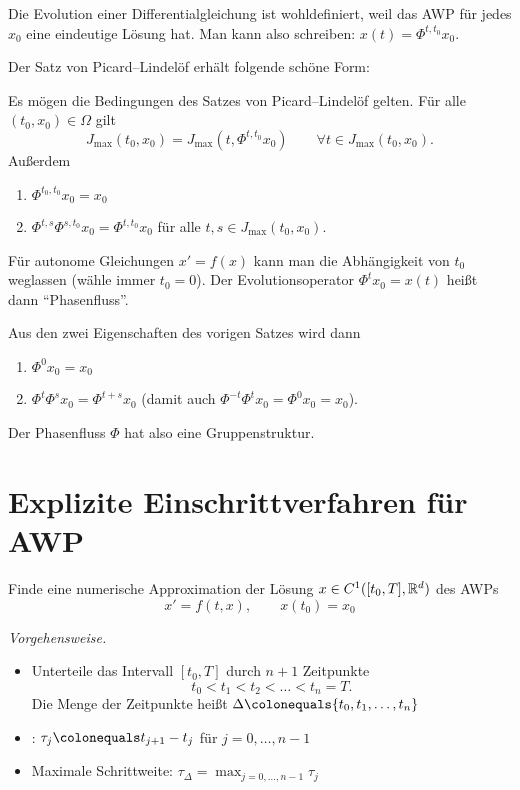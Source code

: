 Die Evolution einer Differentialgleichung ist wohldefiniert, weil das AWP für jedes $x_0$ eine eindeutige Lösung hat. Man kann also schreiben: $x(t) = \Phi^{t,t_0} x_0$.

Der Satz von Picard--Lindelöf erhält folgende schöne Form: \cite[Lemma~2.9]{deuflhard_bornemann:2008}

\begin{satz}
	Es mögen die Bedingungen des Satzes von Picard--Lindelöf gelten.
	Für alle $(t_0,x_0 ) \in \Omega$ gilt
	\begin{equation*}
		J_\text{max} (t_0,x_0)= J_\text{max} (t,\Phi^{t,t_0} x_0)
		\qquad
		\forall t \in J_\text{max} (t_0,x_0).
	\end{equation*}
	Außerdem
	\begin{enumerate}
		\item $\Phi^{t_0,t_0} x_0=x_0$
		\item $\Phi^{t,s} \Phi^{s,t_0} x_0 = \Phi^{t,t_0} x_0$ für alle $t,s \in J_\text{max}(t_0, x_0)$.
	\end{enumerate}
\end{satz}

Für autonome Gleichungen $x'=f(x)$ kann man die Abhängigkeit von $t_0$ weglassen (wähle immer $t_0=0$). Der Evolutionsoperator $\Phi^t x_0=x(t)$ heißt dann \enquote{Phasenfluss}.

Aus den zwei Eigenschaften des vorigen Satzes wird dann
\begin{enumerate}
	\item $\Phi^0 x_0=x_0$
	\item $\Phi^t \Phi^s x_0=\Phi^{t+s} x_0$ (damit auch $\Phi^{-t} \Phi^t x_0=\Phi^0 x_0=x_0$).
\end{enumerate}
Der Phasenfluss $\Phi$ hat also eine Gruppenstruktur.


\section{Explizite Einschrittverfahren für AWP}

\begin{aim}
	Finde eine numerische Approximation der Lösung $x \in C^1 ([t_0,T],\mathbb R^d)$ des AWPs
	\begin{equation*}
		x' = f(t,x),
		\qquad
		x(t_0)=x_0
	\end{equation*}
\end{aim}

\emph{Vorgehensweise.}
\begin{itemize}
	\item Unterteile das Intervall $[t_0,T ]$ durch $n+1$ Zeitpunkte
	\begin{equation}
		t_0<t_1<t_2<\ldots<t_n=T.
	\end{equation}
	Die Menge der Zeitpunkte heißt  $\Delta \colonequals \lbrace t_0,t_1,\ldots,t_n \rbrace$
	\item {}: $\tau_j\colonequals t_{j+1}-t_j$ für $j=0,\ldots,n-1$
	\item Maximale Schrittweite: $\tau_{\Delta}=\max_{j=0,\ldots,n-1} \tau_j$
\end{itemize}

